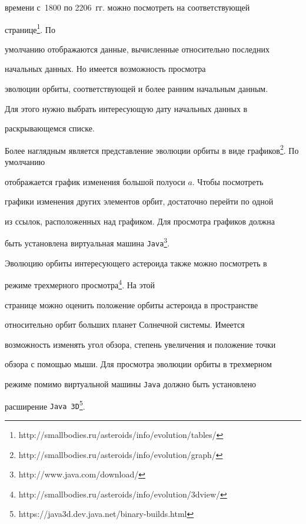 времени с~1800 по 2206~гг. можно посмотреть на соответствующей


странице\footnote{\tt


http://smallbodies.ru/asteroids/info/evolution/tables/}\!\!\!. По


умолчанию отображаются данные, вычисленные относительно последних


начальных данных. Но имеется возможность просмотра 


эволюции орбиты, соответствующей и более ранним начальным данным.


Для этого нужно выбрать интересующую дату начальных данных в


раскрывающемся списке.





Более наглядным является представление эволюции орбиты в виде \mbox{графиков\footnote{\tt


http://smallbodies.ru/asteroids/info/evolution/graph/}\!\!.} По умолчанию


отображается график изменения большой полуоси $a$. Чтобы посмотреть


графики изменения других элементов орбит, достаточно перейти по одной


из ссылок, расположенных над графиком. Для просмотра графиков должна


быть установлена виртуальная машина {\tt Java}\footnote{\tt


http://www.java.com/download/}\!\!.





Эволюцию орбиты интересующего астероида также можно посмотреть в


режиме трехмерного просмотра\footnote{\tt


http://smallbodies.ru/asteroids/info/evolution/3dview/}\!\!. На этой


странице можно оценить положение орбиты астероида в пространстве


относительно орбит больших планет Солнечной системы. Имеется


возможность изменять угол обзора, степень увеличения и положение точки


обзора с помощью мыши. Для просмотра эволюции орбиты в трехмерном


режиме помимо виртуальной машины {\tt Java} должно быть установлено


расширение {\tt Java 3D}\footnote{\tt


https://java3d.dev.java.net/binary-builds.html}\!\!\!\!.





